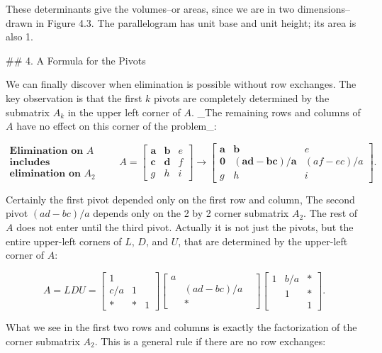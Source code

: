 These determinants give the volumes--or areas, since we are in two dimensions--drawn in Figure 4.3. The parallelogram has unit base and unit height; its area is also 1.

## 4. A Formula for the Pivots

We can finally discover when elimination is possible without row exchanges. The key observation is that the first \(k\) pivots are completely determined by the submatrix \(A_{k}\) in the upper left corner of \(A\). _The remaining rows and columns of \(A\) have no effect on this corner of the problem_:

\[\begin{array}{c}\textbf{Elimination on }A\\ \textbf{includes}\\ \textbf{elimination on }A_{2}\end{array}\qquad A=\begin{bmatrix}\textbf{a}& \textbf{b}&e\\ \textbf{c}&\textbf{d}&f\\ g&h&i\end{bmatrix}\rightarrow\begin{bmatrix}\textbf{a}&\textbf{b}&e\\ \textbf{0}&(\textbf{ad}-\textbf{bc})/\textbf{a}&(af-ec)/a\\ g&h&i\end{bmatrix}.\]

Certainly the first pivot depended only on the first row and column, The second pivot \((ad-bc)/a\) depends only on the 2 by 2 corner submatrix \(A_{2}\). The rest of \(A\) does not enter until the third pivot. Actually it is not just the pivots, but the entire upper-left corners of \(L\), \(D\), and \(U\), that are determined by the upper-left corner of \(A\):

\[A=LDU=\begin{bmatrix}1&&\\ c/a&1&\\ *&*&1\end{bmatrix}\begin{bmatrix}a&\\ &(ad-bc)/a&\\ &*\end{bmatrix}\begin{bmatrix}1&b/a&*\\ &1&*\\ &&1\end{bmatrix}.\]

What we see in the first two rows and columns is exactly the factorization of the corner submatrix \(A_{2}\). This is a general rule if there are no row exchanges:

